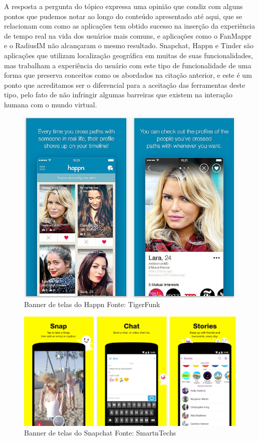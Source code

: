 A resposta a pergunta do tópico expressa uma opinião que condiz com alguns pontos que pudemos notar ao longo do conteúdo apresentado até aqui, que se relacionam com como as aplicações tem obtido sucesso na inserção da experiência de tempo real na vida dos usuários mais comuns, e aplicações como o FanMappr e o RadiusIM não alcançaram o mesmo resultado. Snapchat, Happn e Tinder são aplicações que utilizam localização geográfica em muitas de suas funcionalidades, mas trabalham a experiência do usuário com este tipo de funcionalidade de uma forma que preserva conceitos como os abordados na citação anterior, e este é um ponto que acreditamos ser o diferencial para a aceitação das ferramentas deste tipo, pelo fato de não infringir algumas barreiras que existem na interação humana com o mundo virtual.

\begin{figure}[!h]
	\centering
	\includegraphics[scale=0.6]{imagens/happn.jpg}
	\caption{\small Banner de telas do Happn Fonte: TigerFunk \cite{happn-img}}
	\label{fig:happn-img}
\end{figure}

\begin{figure}[!h]
	\centering
	\includegraphics[scale=0.7]{imagens/snapchat.png}
	\caption{\small Banner de telas do Snapchat Fonte: SmartnTechs \cite{snapchat-img}}
	\label{fig:snapchat-img}
\end{figure}

